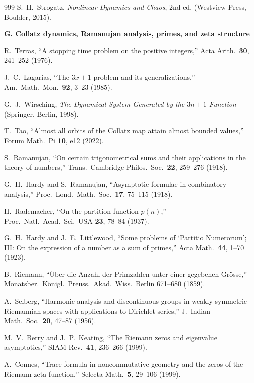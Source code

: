 \documentclass[11pt,a4paper,twoside]{book}
\theoremstyle{definition}
\begin{document}
\begin{thebibliography}{999}
S.~H.~Strogatz,
\emph{Nonlinear Dynamics and Chaos}, 2nd ed.
(Westview Press, Boulder, 2015).

\item[]\textbf{G. Collatz dynamics, Ramanujan analysis, primes, and zeta structure}

R.~Terras,
``A stopping time problem on the positive integers,''
Acta Arith.\ \textbf{30}, 241--252 (1976).

J.~C.~Lagarias,
``The $3x+1$ problem and its generalizations,''
Am.\ Math.\ Mon.\ \textbf{92}, 3--23 (1985).

G.~J.~Wirsching,
\emph{The Dynamical System Generated by the $3n+1$ Function}
(Springer, Berlin, 1998).

T.~Tao,
``Almost all orbits of the Collatz map attain almost bounded values,''
Forum Math.\ Pi \textbf{10}, e12 (2022).

S.~Ramanujan,
``On certain trigonometrical sums and their applications in the theory of
numbers,'' Trans.\ Cambridge Philos.\ Soc.\ \textbf{22}, 259--276 (1918).

G.~H.~Hardy and S.~Ramanujan,
``Asymptotic formulae in combinatory analysis,''
Proc.\ Lond.\ Math.\ Soc.\ \textbf{17}, 75--115 (1918).

H.~Rademacher,
``On the partition function $p(n)$,''
Proc.\ Natl.\ Acad.\ Sci.\ USA \textbf{23}, 78--84 (1937).

G.~H.~Hardy and J.~E.~Littlewood,
``Some problems of `Partitio Numerorum'; III: On the expression of a number as
a sum of primes,'' Acta Math.\ \textbf{44}, 1--70 (1923).

B.~Riemann,
``\"Uber die Anzahl der Primzahlen unter einer gegebenen Gr\"osse,''
Monatsber.\ K\"onigl.\ Preuss.\ Akad.\ Wiss.\ Berlin 671--680 (1859).

A.~Selberg,
``Harmonic analysis and discontinuous groups in weakly symmetric Riemannian
spaces with applications to Dirichlet series,''
J.\ Indian Math.\ Soc.\ \textbf{20}, 47--87 (1956).

M.~V.~Berry and J.~P.~Keating,
``The Riemann zeros and eigenvalue asymptotics,''
SIAM Rev.\ \textbf{41}, 236--266 (1999).

A.~Connes,
``Trace formula in noncommutative geometry and the zeros of the Riemann zeta
function,'' Selecta Math.\ \textbf{5}, 29--106 (1999).


\end{thebibliography}
\end{document}
